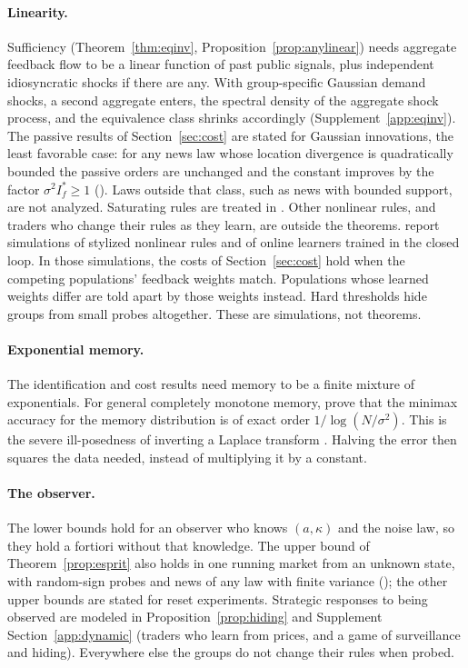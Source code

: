 \documentclass[12pt]{article}
\theoremstyle{definition}
\theoremstyle{remark}
\begin{document}
\paragraph{Linearity.} Sufficiency (Theorem~\ref{thm:eqinv}, Proposition~\ref{prop:anylinear}) needs aggregate feedback flow to be a linear function of past public signals, plus independent idiosyncratic shocks if there are any. With group-specific Gaussian demand shocks, a second aggregate enters, the spectral density of the aggregate shock process, and the equivalence class shrinks accordingly (Supplement~\ref{app:eqinv}). The passive results of Section~\ref{sec:cost} are stated for Gaussian innovations, the least favorable case: for any news law whose location divergence is quadratically bounded the passive orders are unchanged and the constant improves by the factor $\sigma^2I^*_f\ge1$ (\citealp[their Proposition~S16.2]{niroula2026full}). Laws outside that class, such as news with bounded support, are not analyzed. Saturating rules are treated in \citet[their Section~S6]{niroula2026full}. Other nonlinear rules, and traders who change their rules as they learn, are outside the theorems. \citet{niroula2026a} report simulations of stylized nonlinear rules and of online learners trained in the closed loop. In those simulations, the costs of Section~\ref{sec:cost} hold when the competing populations' feedback weights match. Populations whose learned weights differ are told apart by those weights instead. Hard thresholds hide groups from small probes altogether. These are simulations, not theorems.

\paragraph{Exponential memory.} The identification and cost results need memory to be a finite mixture of exponentials. For general completely monotone memory, \citet{niroula2026a} prove that the minimax accuracy for the memory distribution is of exact order $1/\log(N/\sigma^2)$. This is the severe ill-posedness of inverting a Laplace transform \citep{epstein2008}. Halving the error then squares the data needed, instead of multiplying it by a constant.

\paragraph{The observer.} The lower bounds hold for an observer who knows $(a,\kappa)$ and the noise law, so they hold a fortiori without that knowledge. The upper bound of Theorem~\ref{prop:esprit} also holds in one running market from an unknown state, with random-sign probes and news of any law with finite variance (\citealp[their Theorem~S16.1]{niroula2026full}); the other upper bounds are stated for reset experiments. Strategic responses to being observed are modeled in Proposition~\ref{prop:hiding} and Supplement Section~\ref{app:dynamic} (traders who learn from prices, and a game of surveillance and hiding). Everywhere else the groups do not change their rules when probed.
\end{document}
